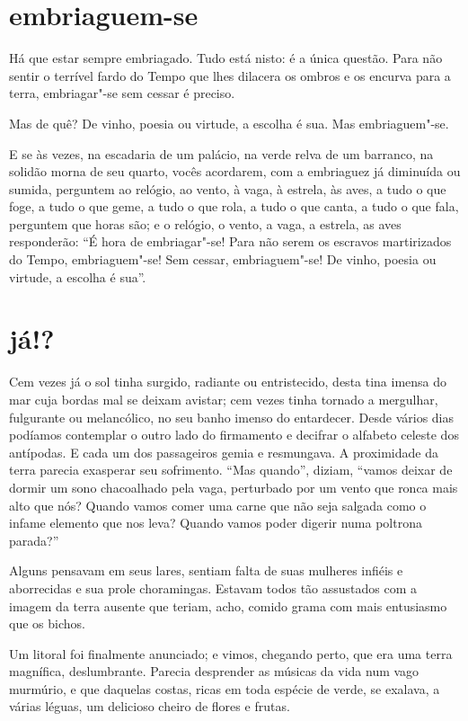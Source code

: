 \quebra\section[Embriaguem-se]{embriaguem-se}

Há que estar sempre embriagado. Tudo está nisto: é a única questão. Para
não sentir o terrível fardo do Tempo que lhes dilacera os ombros e os
encurva para a terra, embriagar"-se sem cessar é preciso.

Mas de quê? De vinho, poesia ou virtude, a escolha é sua. Mas
embriaguem"-se.

E se às vezes, na escadaria de um palácio, na verde relva de um
barranco, na solidão morna de seu quarto, vocês acordarem, com a
embriaguez já diminuída ou sumida, perguntem ao relógio, ao vento, à
vaga, à estrela, às aves, a tudo o que foge, a tudo o que geme, a tudo o que
rola, a tudo o que canta, a tudo o que fala, perguntem que horas são; e
o relógio, o vento, a vaga, a estrela, as aves responderão:
“É hora de embriagar"-se! Para não serem os escravos
martirizados do Tempo, embriaguem"-se! Sem cessar, embriaguem"-se! De
vinho, poesia ou virtude, a escolha é sua''.

\quebra\section[Já!?]{já!?}

Cem vezes já o sol tinha surgido, radiante ou entristecido, desta tina
imensa do mar cuja bordas mal se deixam avistar; cem vezes tinha
tornado a mergulhar, fulgurante ou melancólico, no seu banho imenso do
entardecer. Desde vários dias podíamos contemplar o outro lado do
firmamento e decifrar o alfabeto celeste dos antípodas. E cada um dos
passageiros gemia e resmungava. A proximidade da
terra parecia exasperar seu sofrimento. “Mas quando'',
 diziam, “vamos deixar de dormir
um sono chacoalhado pela vaga, perturbado por um vento que ronca mais
alto que nós? Quando vamos comer uma carne que não seja
salgada como o infame elemento que nos leva? Quando vamos poder
digerir numa poltrona parada?''

Alguns pensavam em seus lares, sentiam falta de suas mulheres
infiéis e aborrecidas e sua prole choramingas. Estavam todos tão
assustados com a imagem da terra ausente que teriam, acho, comido
grama com mais entusiasmo que os bichos.

Um litoral foi finalmente anunciado; e vimos, chegando perto, que era
uma terra magnífica, deslumbrante. Parecia desprender as músicas da vida
num vago murmúrio, e que daquelas costas, ricas em toda
espécie de verde, se exalava, a várias léguas, um delicioso cheiro de
flores e frutas.

